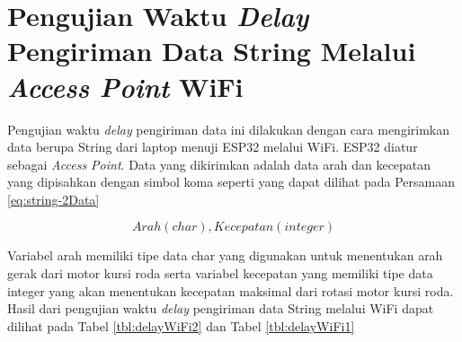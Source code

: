\section{Pengujian Waktu \emph{Delay} Pengiriman Data String Melalui \emph{Access Point} WiFi}
\label{sec:delayWiFi}

Pengujian waktu \emph{delay} pengiriman data ini dilakukan dengan cara mengirimkan data berupa String dari laptop menuji ESP32 melalui WiFi. ESP32 diatur sebagai \emph{Access Point}. Data yang dikirimkan adalah data arah dan kecepatan yang dipisahkan dengan simbol koma seperti yang dapat dilihat pada Persamaan \ref{eq:string-2Data}

\begin{equation}
  \label{eq:string-2Data}
    Arah(char),Kecepatan(integer)
\end{equation}

Variabel arah memiliki tipe data char yang digunakan untuk menentukan arah gerak dari motor kursi roda serta variabel kecepatan yang memiliki tipe data integer yang akan menentukan kecepatan maksimal dari rotasi motor kursi roda. Hasil dari pengujian waktu \emph{delay} pengiriman data String melalui WiFi dapat dilihat pada Tabel \ref{tbl:delayWiFi2} dan Tabel \ref{tbl:delayWiFi1}

